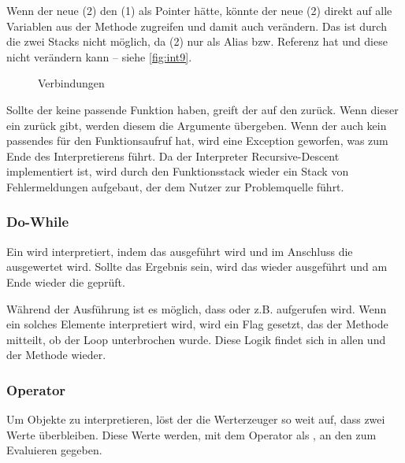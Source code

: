 {      Wenn der neue (2) den  (1) als Pointer hätte, könnte der neue (2) direkt auf alle Variablen aus der  Methode zugreifen und damit auch  verändern. Das ist durch die zwei Stacks nicht möglich, da (2)  nur als Alias bzw. Referenz hat und diese nicht verändern kann -- siehe \autoref{fig:int9}.
      \begin{figure}[H]
        \centering
        \caption{ Verbindungen}
        \label{fig:intstack}
      \end{figure}

      Sollte der  keine passende Funktion haben, greift der  auf den  zurück. Wenn dieser ein  zurück gibt, werden diesem die Argumente übergeben. Wenn der  auch kein passendes  für den Funktionsaufruf hat, wird eine Exception geworfen, was zum Ende des Interpretierens führt. Da der Interpreter Recursive-Descent implementiert ist, wird durch den Funktionsstack wieder ein Stack von Fehlermeldungen aufgebaut, der dem Nutzer zur Problemquelle führt.

    \subsubsection{Do-While}
    \label{sssec:Do-While}
      Ein  wird interpretiert, indem das  ausgeführt wird und im Anschluss die  ausgewertet wird. Sollte das Ergebnis  sein, wird das  wieder ausgeführt und am Ende wieder die  geprüft.

      Während der Ausführung ist es möglich, dass  oder z.B.  aufgerufen wird. Wenn ein solches Elemente interpretiert wird, wird ein Flag gesetzt, das der  Methode mitteilt, ob der Loop unterbrochen wurde. Diese Logik findet sich in allen  und der  Methode wieder.

    \subsubsection{Operator}
    \label{sssec:Operator}
      Um  Objekte zu interpretieren, löst der  die Werterzeuger so weit auf, dass zwei  Werte überbleiben. Diese Werte werden, mit dem Operator als , an den  zum Evaluieren gegeben.

}
